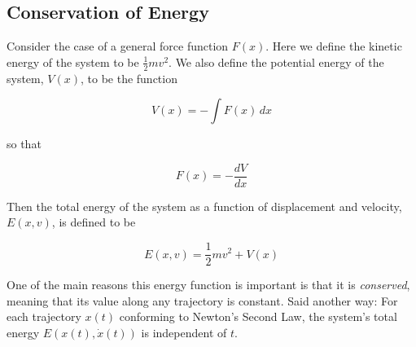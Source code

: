 %
%	
%
%
\subsection{Conservation of Energy}
\label{subsec:conservation_of_energy}
Consider the case of a general force function $F(x)$. Here we define the kinetic 
energy of the system to be $\frac{1}{2}mv^{2}$. We also define the potential 
energy of the system, $V(x)$, to be the function

\begin{equation}
V(x) = - \int F(x) \, dx
\label{eqn:V(x)}
\end{equation}

\noindent
so that 

\begin{equation}
F(x) = -\dfrac{dV}{dx}
\label{eqn:F}
\end{equation}

\medskip
\noindent
Then the total energy of the system as a function of displacement and 
velocity, $E(x,v)$, is defined to be 


\begin{equation}
E(x,v) = \dfrac{1}{2}mv^{2} + V(x)
\label{eqn:E}
\end{equation}

\medskip
\noindent
One of the main reasons this energy function is important is that it is 
\emph{conserved}, meaning that its value along any trajectory is constant.
Said another way: For each trajectory $x(t)$ conforming to Newton’s 
Second Law, the system's total energy $E(x(t),\dot{x}(t))$ is independent 
of $t$.

